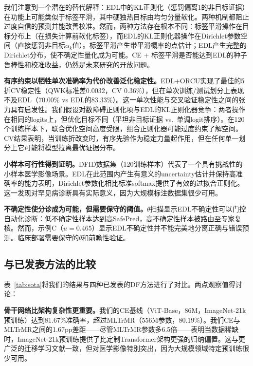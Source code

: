 \documentclass[12pt,a4paper]{ctexart}
\begin{document}
我们注意到一个潜在的替代解释：EDL中的KL正则化（惩罚偏离1的非目标证据）在功能上可能类似于标签平滑\cite{muller2019labelsmoothing}，其中硬独热目标由均匀分量软化。两种机制都阻止过度自信的预测并能改善校准。然而，两种方法存在根本不同：标签平滑操作在目标分布上（在损失计算前软化标签），而EDL的KL正则化器操作在Dirichlet参数空间（直接惩罚非目标$\alpha_k$值）。标签平滑产生带平滑概率的点估计；EDL产生完整的Dirichlet分布，使不确定性量化成为可能。CE $+$ 标签平滑是否能达到EDL的种子鲁棒性和校准收益，仍然是未来研究的开放问题。

\textbf{有序约束以牺牲单次准确率为代价改善泛化稳定性。}EDL+ORCU实现了最佳的5折CV稳定性（QWK标准差0.0032，CV 0.36\%），但在单次训练/测试划分上表现不及EDL（70.00\% vs EDL的83.33\%）。这一单次性能与交叉验证稳定性之间的张力具有启发性。我们假设对数障碍正则化项与EDL的KL正则化器竞争：两者操作在相同的logits上，但优化目标不同（平坦非目标证据 vs.\ 单调logit排序）。在120个训练样本下，联合优化空间高度受限，组合正则化器可能过度约束了解空间。CV结果表明，当训练折改变时，有序先验作为稳定力量起作用，但在任何单一划分上它可能将模型拉离最优证据分布。

\textbf{小样本可行性得到证明。}DFID数据集（120训练样本）代表了一个具有挑战性的小样本医学影像场景。EDL在此范围内产生有意义的uncertainty估计并保持高准确率的能力表明，Dirichlet参数化相比标准softmax提供了有效的过拟合正则化。这一发现对罕见病诊断具有实际意义\cite{xie2024fewshot}，因为大规模标注数据集很少可用\cite{zhang2023dentalai}。

\textbf{不确定性使分诊成为可能，但需要保守的阈值。}$\theta$扫描显示EDL不确定性可以门控自动化诊断：低不确定性样本达到高SafePred，高不确定性样本被路由至专家复核。然而，示例C（$u=0.465$）显示EDL不确定性并不能完美地分离正确与错误预测。临床部署需要保守的$\theta$和前瞻性验证\cite{abdar2021uncertainty}。

\subsection{与已发表方法的比较}

表~\ref{tab:sota}将我们的结果与四种已发表的DF方法进行了对比。两点观察值得讨论：

\textbf{骨干网络比架构复杂性更重要。}我们的CE基线（ViT-Base，86M，ImageNet-21k预训练）达到81.67\%准确率，超过MLTrMR（556M参数，80.19\%）。我们CE与MLTrMR之间的1.67pp差距——尽管MLTrMR参数多6.5倍——表明当数据稀缺时，ImageNet-21k预训练提供了比定制Transformer架构更强的归纳偏置。这与更广泛的迁移学习文献一致\cite{raghu2019transfusion}，但对医学影像特别突出，因为大规模领域特定预训练很少可用\cite{xie2024fewshot}。
\end{document}
